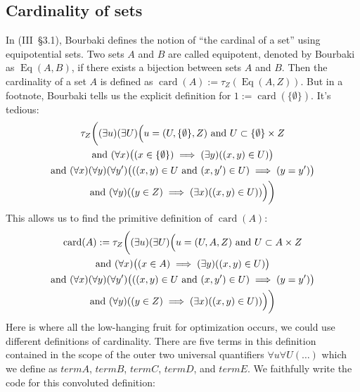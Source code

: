 \documentclass{amsart}
\newcommand{\Varid}[1]{\mathit{#1}}
\DeclareMathOperator{\card}{card}
\DeclareMathOperator{\Eq}{Eq}
\begin{document}
\subsection{Cardinality of sets}
In (III~\S3.1), Bourbaki defines the notion of ``the cardinal of a set''
using equipotential sets.
Two sets $A$ and $B$ are called equipotent, denoted by Bourbaki as
$\Eq(A,B)$, if there exists a bijection between sets $A$ and $B$.
Then the cardinality of a set $A$ is defined as $\card(A):=\tau_{Z}(\Eq(A,Z))$.
But in a footnote, Bourbaki tells us the explicit definition for 
$1:=\card(\{\emptyset\})$. It's tedious:
\begin{multline}
  \tau_{Z}\biggl(
(\exists u)(\exists U)\Bigl(u=(U,\{\emptyset\},Z)\mbox{ and }U\subset\{\emptyset\}\times Z\\
\mbox{and }(\forall x)\bigl((x\in\{\emptyset\})\implies(\exists y)((x,y)\in U)\bigr)\\
\mbox{and }(\forall x)(\forall y)(\forall y')\bigl(((x,y)\in U\mbox{ and }(x,y')\in U)\implies(y=y')\bigr)\\
\mbox{and }(\forall y)((y\in Z)\implies(\exists x)((x,y)\in U))\Bigr)
\biggr)
\end{multline}
This allows us to find the primitive definition of $\card(A)$:
\begin{multline}
\card(A):=\tau_{Z}\biggl(
(\exists u)(\exists U)\Bigl(u=(U,A,Z)\mbox{ and }U\subset A\times Z\\
\mbox{and }(\forall x)\bigl((x\in A)\implies(\exists y)((x,y)\in U)\bigr)\\
\mbox{and }(\forall x)(\forall y)(\forall y')\bigl(((x,y)\in U\mbox{ and }(x,y')\in U)\implies(y=y')\bigr)\\
\mbox{and }(\forall y)((y\in Z)\implies(\exists x)((x,y)\in U))\Bigr)
\biggr)
\end{multline}
Here is where all the low-hanging fruit for optimization occurs, we
could use different definitions of cardinality. There are five terms in
this definition contained in the scope of the outer two universal
quantifiers $\forall u\forall U(\dots)$ which we define as \ensuremath{\Varid{termA}},
\ensuremath{\Varid{termB}}, \ensuremath{\Varid{termC}}, \ensuremath{\Varid{termD}}, and \ensuremath{\Varid{termE}}. We faithfully write the
code for this convoluted definition:
\end{document}
